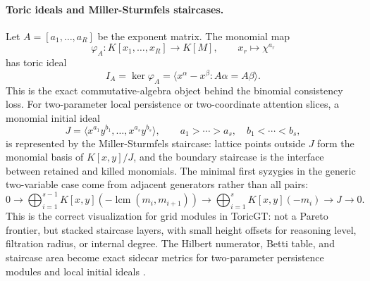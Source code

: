 \documentclass[11pt]{article}
\theoremstyle{definition}
\theoremstyle{plain}
\theoremstyle{remark}
\numberwithin{equation}{section}
\begin{document}
\paragraph{Toric ideals and Miller-Sturmfels staircases.}
Let $A=[a_1,\ldots,a_R]$ be the exponent matrix.  The monomial map
\begin{equation}
  \varphi_A:K[x_1,\ldots,x_R]\to K[M],
  \qquad x_r\mapsto \chi^{a_r}
\end{equation}
has toric ideal
\begin{equation}
  I_A=\ker\varphi_A
  =
  \langle x^\alpha-x^\beta:A\alpha=A\beta\rangle.
\end{equation}
This is the exact commutative-algebra object behind the binomial consistency loss.  For two-parameter local persistence or two-coordinate attention slices, a monomial initial ideal
\begin{equation}
  J=\langle x^{a_1}y^{b_1},\ldots,x^{a_s}y^{b_s}\rangle,
  \qquad a_1>\cdots>a_s,\quad b_1<\cdots<b_s,
\end{equation}
is represented by the Miller-Sturmfels staircase: lattice points outside $J$ form the monomial basis of $K[x,y]/J$, and the boundary staircase is the interface between retained and killed monomials.  The minimal first syzygies in the generic two-variable case come from adjacent generators rather than all pairs:
\begin{equation}
  0\longrightarrow
  \bigoplus_{i=1}^{s-1}K[x,y](-\operatorname{lcm}(m_i,m_{i+1}))
  \longrightarrow
  \bigoplus_{i=1}^{s}K[x,y](-m_i)
  \longrightarrow
  J
  \longrightarrow 0.
\end{equation}
This is the correct visualization for grid modules in ToricGT: not a Pareto frontier, but stacked staircase layers, with small height offsets for reasoning level, filtration radius, or internal degree.  The Hilbert numerator, Betti table, and staircase area become exact sidecar metrics for two-parameter persistence modules and local initial ideals \cite{millersturmfels2005cca}.
\end{document}
